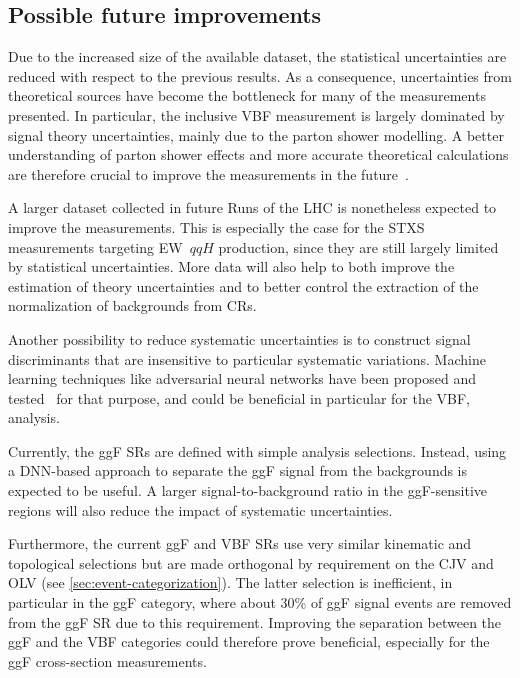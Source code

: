 \subsection{Possible future improvements}
Due to the increased size of the available dataset, the statistical uncertainties are reduced with respect to the previous results.
As a consequence, uncertainties from theoretical sources have become the bottleneck for many of the measurements presented.
In particular, the inclusive VBF measurement is largely dominated by signal theory uncertainties, mainly due to the parton shower modelling.
A better understanding of parton shower effects and more accurate theoretical calculations are therefore crucial to improve the measurements in the future~\cite{Jger2020}. 

A larger dataset collected in future Runs of the LHC is nonetheless expected to improve the measurements. This is especially the case for the STXS measurements targeting EW~$qqH$ production, since they are still largely limited by statistical uncertainties. 
More data will also help to both improve the estimation of theory uncertainties and to better control the extraction of the normalization of backgrounds from CRs. 

Another possibility to reduce systematic uncertainties is to construct signal discriminants that are insensitive to particular systematic variations. Machine learning techniques like adversarial neural networks have been proposed and tested~\cite{Englert2019,adversarialClavijoJoseM} for that purpose, and could be beneficial in particular for the VBF, \HWW analysis.

Currently, the ggF SRs are defined with simple analysis selections. Instead, using a DNN-based approach to separate the ggF signal from the backgrounds is expected to be useful. 
A larger signal-to-background ratio in the ggF-sensitive regions will also reduce the impact of systematic uncertainties. 

Furthermore, the current ggF and VBF \TwoJet SRs use very similar kinematic and topological selections but are made orthogonal by requirement on the CJV and OLV (see \cref{sec:event-categorization}). The latter selection is inefficient, in particular in the ggF \TwoJet category, where about 30\% of ggF signal events are removed from the ggF SR due to this requirement. Improving the separation between the ggF \TwoJet and the VBF \TwoJet categories could therefore prove beneficial, especially for the ggF \TwoJet cross-section measurements. 

